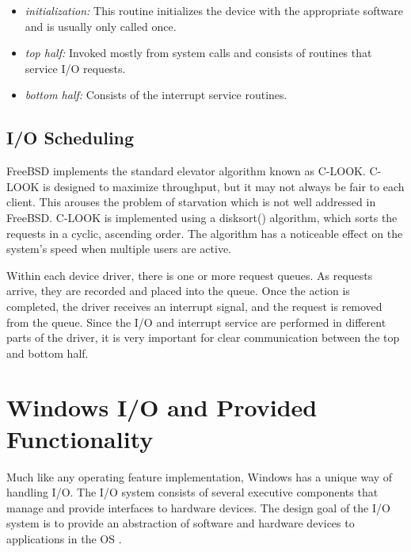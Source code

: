 \documentclass[10pt, onecolumn]{IEEEtran}
\begin{document}
            \begin{itemize}
                \item \textit{initialization:} This routine initializes the device with the appropriate software and is usually only called once.
                \item \textit{top half:} Invoked mostly from system calls and consists of routines that service I/O requests.
                \item \textit{bottom half:} Consists of the interrupt service routines.
            \end{itemize}
            
            
        \subsection{I/O Scheduling}
            FreeBSD implements the standard elevator algorithm known as C-LOOK. C-LOOK is designed to maximize throughput, but it may not always be fair to each client. This arouses the problem of starvation which is not well addressed in FreeBSD. C-LOOK is implemented using a disksort() algorithm, which sorts the requests in a cyclic, ascending order. The algorithm has a noticeable effect on the system's speed when multiple users are active. 
            
            \vspace{1.5mm}
            
            Within each device driver, there is one or more request queues. As requests arrive, they are recorded and placed into the queue. Once the action is completed, the driver receives an interrupt signal, and the request is removed from the queue. Since the I/O and interrupt service are performed in different parts of the driver, it is very important for clear communication between the top and bottom half.
    
    
    \section{Windows I/O and Provided Functionality}
        Much like any operating feature implementation, Windows has a unique way of handling I/O. The I/O system consists of several executive components that manage and provide interfaces to hardware devices. The design goal of the I/O system is to provide an abstraction of software and hardware devices to applications in the OS \cite{wio}.
        
        \vspace{1.5mm}
        
\end{document}
